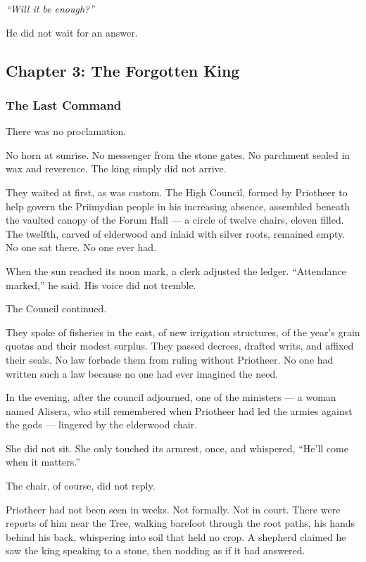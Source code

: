 \documentclass[12pt]{article}
\begin{document}
\vspace{0.5em}
\textit{``Will it be enough?''}

\vspace{0.5em}
He did not wait for an answer.

\newpage

\subsection{Chapter 3: The Forgotten King}

\vspace{.5in}

\subsubsection{The Last Command}

There was no proclamation.

No horn at sunrise. No messenger from the stone gates. No parchment sealed in wax and reverence. The king simply did not arrive.

They waited at first, as was custom. The High Council, formed by Priotheer to help govern the Priimydian people in his increasing absence, assembled beneath the vaulted canopy of the Forum Hall — a circle of twelve chairs, eleven filled. The twelfth, carved of elderwood and inlaid with silver roots, remained empty. No one sat there. No one ever had.

When the sun reached its noon mark, a clerk adjusted the ledger. “Attendance marked,” he said. His voice did not tremble.

The Council continued.

They spoke of fisheries in the east, of new irrigation structures, of the year’s grain quotas and their modest surplus. They passed decrees, drafted writs, and affixed their seals. No law forbade them from ruling without Priotheer. No one had written such a law because no one had ever imagined the need.

In the evening, after the council adjourned, one of the ministers — a woman named Alisera, who still remembered when Priotheer had led the armies against the gods — lingered by the elderwood chair.

She did not sit. She only touched its armrest, once, and whispered, “He’ll come when it matters.”

The chair, of course, did not reply.

Priotheer had not been seen in weeks. Not formally. Not in court. There were reports of him near the Tree, walking barefoot through the root paths, his hands behind his back, whispering into soil that held no crop. A shepherd claimed he saw the king speaking to a stone, then nodding as if it had answered.
\end{document}
